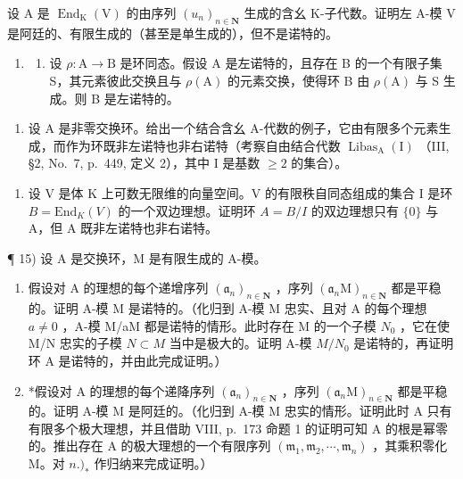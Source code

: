 设 \(\mathrm{A}\) 是 \(\operatorname{End}_{\mathrm{K}}(\mathrm{V})\) 的由序列 \((u_n)_{n \in \mathbf{N}}\) 生成的含幺 K-子代数。证明左 A-模 \(\mathrm{V}\) 是阿廷的、有限生成的（甚至是单生成的），但不是诺特的。

\begin{enumerate}
\def\labelenumi{\arabic{enumi})}
\setcounter{enumi}{12}
\tightlist
\item
  \begin{enumerate}
  \def\labelenumii{\alph{enumii})}
  \tightlist
  \item
    设 \(\rho: \mathrm{A} \to \mathrm{B}\) 是环同态。假设 A 是左诺特的，且存在 B 的一个有限子集 S，其元素彼此交换且与 \(\rho(\mathrm{A})\) 的元素交换，使得环 B 由 \(\rho(\mathrm{A})\) 与 S 生成。则 B 是左诺特的。
  \end{enumerate}
\end{enumerate}

\begin{enumerate}
\def\labelenumi{\alph{enumi})}
\setcounter{enumi}{1}
\tightlist
\item
  设 A 是非零交换环。给出一个结合含幺 A-代数的例子，它由有限多个元素生成，而作为环既非左诺特也非右诺特（考察自由结合代数 \(\operatorname{Libas}_{\mathrm{A}}(\mathrm{I})\) （III, §2, No.~7, p.~449, 定义 2），其中 I 是基数 \(\geqslant 2\) 的集合）。
\end{enumerate}

\begin{enumerate}
\def\labelenumi{\arabic{enumi})}
\setcounter{enumi}{13}
\tightlist
\item
  设 V 是体 K 上可数无限维的向量空间。V 的有限秩自同态组成的集合 I 是环 \(B = \text{End}_{K}(V)\) 的一个双边理想。证明环 \(A = B/I\) 的双边理想只有 \(\{0\}\) 与 A，但 A 既非左诺特也非右诺特。
\end{enumerate}

¶ 15) 设 A 是交换环，M 是有限生成的 A-模。

\begin{enumerate}
\def\labelenumi{\alph{enumi})}
\item
  假设对 A 的理想的每个递增序列 \((\mathfrak{a}_{n})_{n\in\mathbf{N}}\) ，序列 \((\mathfrak{a}_{n}\mathrm{M})_{n\in\mathbf{N}}\) 都是平稳的。证明 A-模 M 是诺特的。（化归到 A-模 M 忠实、且对 A 的每个理想 \(a\neq0\) ，A-模 M/aM 都是诺特的情形。此时存在 M 的一个子模 \(N_{0}\) ，它在使 M/N 忠实的子模 \(N\subset M\) 当中是极大的。证明 A-模 \(M/N_{0}\) 是诺特的，再证明环 A 是诺特的，并由此完成证明。）
\item
  *假设对 A 的理想的每个递降序列 \((\mathfrak{a}_n)_{n \in \mathbf{N}}\) ，序列 \((\mathfrak{a}_n\mathrm{M})_{n \in \mathbf{N}}\) 都是平稳的。证明 A-模 M 是阿廷的。（化归到 A-模 M 忠实的情形。证明此时 A 只有有限多个极大理想，并且借助 VIII, p.~173 命题 1 的证明可知 A 的根是幂零的。推出存在 A 的极大理想的一个有限序列 \((\mathfrak{m}_{1}, \mathfrak{m}_{2}, \cdots, \mathfrak{m}_{n})\) ，其乘积零化 M。对 \(n.)_{*}\) 作归纳来完成证明。）
\end{enumerate}

